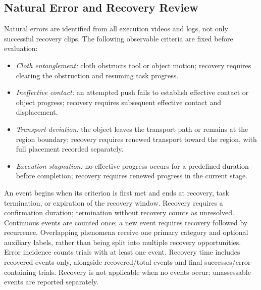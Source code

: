 \subsection{Natural Error and Recovery Review}
\label{app:naturalrecovery}
Natural errors are identified from all execution videos and logs, not only successful recovery clips.
The following observable criteria are fixed before evaluation:
\begin{itemize}
\item \emph{Cloth entanglement:} cloth obstructs tool or object motion; recovery requires clearing the obstruction and resuming task progress.
\item \emph{Ineffective contact:} an attempted push fails to establish effective contact or object progress; recovery requires subsequent effective contact and displacement.
\item \emph{Transport deviation:} the object leaves the transport path or remains at the region boundary; recovery requires renewed transport toward the region, with full placement recorded separately.
\item \emph{Execution stagnation:} no effective progress occurs for a predefined duration before completion; recovery requires renewed progress in the current stage.
\end{itemize}
An event begins when its criterion is first met and ends at recovery, task termination, or expiration of the recovery window.
Recovery requires a confirmation duration; termination without recovery counts as unresolved.
Continuous events are counted once; a new event requires recovery followed by recurrence.
Overlapping phenomena receive one primary category and optional auxiliary labels, rather than being split into multiple recovery opportunities.
Error incidence counts trials with at least one event.
Recovery time includes recovered events only, alongside recovered/total events and final successes/error-containing trials.
Recovery is not applicable when no events occur; unassessable events are reported separately.

